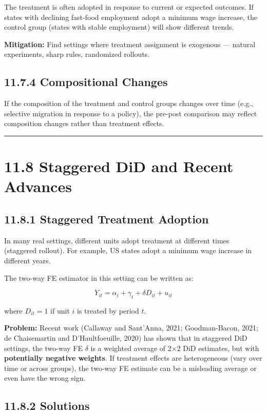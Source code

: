 The treatment is often adopted in response to current or expected outcomes. If states with declining fast-food employment adopt a minimum wage increase, the control group (states with stable employment) will show different trends.

\textbf{Mitigation:} Find settings where treatment assignment is exogenous --- natural experiments, sharp rules, randomized rollouts.

\subsection{11.7.4 Compositional Changes}

If the composition of the treatment and control groups changes over time (e.g., selective migration in response to a policy), the pre-post comparison may reflect composition changes rather than treatment effects.

\medskip\hrule\medskip

\section{11.8 Staggered DiD and Recent Advances}

\subsection{11.8.1 Staggered Treatment Adoption}

In many real settings, different units adopt treatment at different times (staggered rollout). For example, US states adopt a minimum wage increase in different years.

The two-way FE estimator in this setting can be written as:

\[
Y_{it} = \alpha_i + \gamma_t + \delta D_{it} + u_{it}
\]

where $D_{it} = 1$ if unit $i$ is treated by period $t$.

\textbf{Problem:} Recent work (Callaway and Sant'Anna, 2021; Goodman-Bacon, 2021; de Chaisemartin and D'Haultfoeuille, 2020) has shown that in staggered DiD settings, the two-way FE $\delta$ is a weighted average of 2$\times$2 DiD estimates, but with \textbf{potentially negative weights}. If treatment effects are heterogeneous (vary over time or across groups), the two-way FE estimate can be a misleading average or even have the wrong sign.

\subsection{11.8.2 Solutions}

